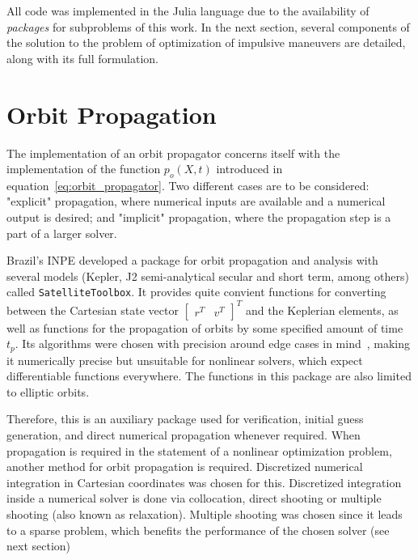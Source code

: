 
All code was implemented in the Julia language due to the availability of \textit{packages} for subproblems of this work. In the next section, several components of the solution to the problem of optimization of impulsive maneuvers are detailed, along with its full formulation.

\section{Orbit Propagation}\label{sec:orbit_propagation}

The implementation of an orbit propagator concerns itself with the implementation of the function \(p_o(X, t)\) introduced in equation~\eqref{eq:orbit_propagator}. Two different cases are to be considered: "explicit" propagation, where numerical inputs are available and a numerical output is desired; and "implicit" propagation, where the propagation step is a part of a larger solver.

Brazil's INPE developed a package for orbit propagation and analysis with several models (Kepler, J2 semi-analytical secular and short term, among others) called \texttt{SatelliteToolbox}. It provides quite convient functions for converting between the Cartesian state vector \(\begin{bmatrix}
    r^T & v^T
\end{bmatrix}^T\) and the Keplerian elements, as well as functions for the propagation of orbits by some specified amount of time \(t_p\). Its algorithms were chosen with precision around edge cases in mind~\cite{rv_to_kepler}, making it numerically precise but unsuitable for nonlinear solvers, which expect differentiable functions everywhere. The functions in this package are also limited to elliptic orbits.

Therefore, this is an auxiliary package used for verification, initial guess generation, and direct numerical propagation whenever required. When propagation is required in the statement of a nonlinear optimization problem, another method for orbit propagation is required. Discretized numerical integration in Cartesian coordinates was chosen for this. Discretized integration inside a numerical solver is done via collocation, direct shooting or multiple shooting (also known as relaxation). Multiple shooting was chosen since it leads to a sparse problem, which benefits the performance of the chosen solver (see next section)

